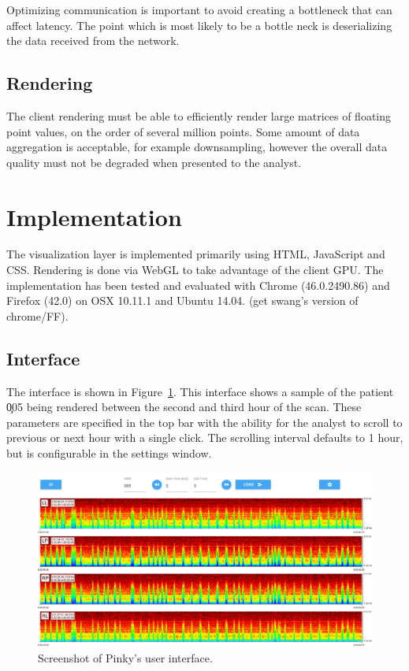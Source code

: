 Optimizing communication is important to avoid creating a bottleneck that can
affect latency. The point which is most likely to be a bottle neck is
deserializing the data received from the network.

\subsection{Rendering}

The client rendering must be able to efficiently render large matrices of
floating point values, on the order of several million points. Some amount of
data aggregation is acceptable, for example downsampling, however the overall
data quality must not be degraded when presented to the analyst.

\section{Implementation}

The visualization layer is implemented primarily using HTML, JavaScript and
CSS. Rendering is done via WebGL to take advantage of the client GPU. The
implementation has been tested and evaluated with Chrome (46.0.2490.86) and
Firefox (42.0) on OSX 10.11.1 and Ubuntu 14.04. (get swang's version of
chrome/FF).

\subsection{Interface}

The interface is shown in Figure~\ref{fig:whole-interface}. This interface
shows a sample of the patient \c{005} being rendered between the second and
third hour of the scan. These parameters are specified in the top bar with the
ability for the analyst to scroll to previous or next hour with a single click.
The scrolling interval defaults to 1 hour, but is configurable in the settings
window. \\

\begin{figure}[h]
\begin{center}
\includegraphics[scale=0.35]{./img/whole-interface.png}
\caption{Screenshot of Pinky's user interface.}
\label{fig:whole-interface}
\end{center}
\end{figure}

